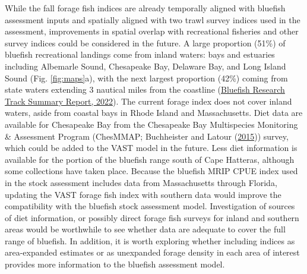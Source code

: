 \documentclass[
]{article}
\begin{document}
While the fall forage fish indices are already temporally aligned with bluefish assessment inputs and spatially aligned with two trawl survey indices used in the assessment, improvements in spatial overlap with recreational fisheries and other survey indices could be considered in the future. A large proportion (51\%) of bluefish recreational landings come from inland waters: bays and estuaries including Albemarle Sound, Chesapeake Bay, Delaware Bay, and Long Island Sound (Fig. \ref{fig:maps}a), with the next largest proportion (42\%) coming from state waters extending 3 nautical miles from the coastline (\href{https://apps-nefsc.fisheries.noaa.gov/saw/sasi_files.php?year=2022\&species_id=32\&stock_id=6\&review_type_id=5\&info_type_id=-1\&map_type_id=\&filename=Bluefish_SAW_SARC_2022_FINAL.pdf}{Bluefish Research Track Summary Report, 2022}). The current forage index does not cover inland waters, aside from coastal bays in Rhode Island and Massachusetts. Diet data are available for Chesapeake Bay from the Chesapeake Bay Multispecies Monitoring \& Assessment Program (ChesMMAP; Buchheister and Latour (\protect\hyperlink{ref-buchheister_diets_2015}{2015})) survey, which could be added to the VAST model in the future. Less diet information is available for the portion of the bluefish range south of Cape Hatteras, although some collections have taken place. Because the bluefish MRIP CPUE index used in the stock assessment includes data from Massachusetts through Florida, updating the VAST forage fish index with southern data would improve the compatibility with the bluefish stock assessment model. Investigation of sources of diet information, or possibly direct forage fish surveys for inland and southern areas would be worthwhile to see whether data are adequate to cover the full range of bluefish. In addition, it is worth exploring whether including indices as area-expanded estimates or as unexpanded forage density in each area of interest provides more information to the bluefish assessment model.
\end{document}
